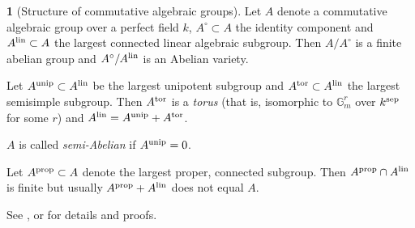 \documentclass{amsart}
\theoremstyle{definition}
\newtheorem{say}[thm]{}
\theoremstyle{remark}
\newcommand{\gm}[0]{{\mathbb G}_m}
\begin{document}
\begin{say}[Structure of commutative algebraic groups]\label{com.al.gr.say}
Let  $A$ denote  a  commutative algebraic group over a perfect field $k$,
  $A^\circ\subset A$ the identity component   and
$A^{\rm lin}\subset A$ the largest connected linear algebraic subgroup. Then 
$A/A^\circ$ is a finite abelian group and  $A^\circ/A^{\rm lin}$ is an Abelian variety.

Let  $A^{\rm unip}\subset A^{\rm lin}$ be the largest unipotent subgroup
 and    $A^{\rm tor}\subset A^{\rm lin}$ the largest semisimple subgroup.
Then 
$A^{\rm tor}$ is a {\it torus} (that is, isomorphic to   $\gm^r$ over $ k^{\rm sep}$ for some $r$)   and
$A^{\rm lin}=A^{\rm unip}+A^{\rm tor}$.

$A$ is called  {\it semi-Abelian} if $A^{\rm unip}=0$.

Let $A^{\rm prop}\subset A$ denote the largest proper, connected subgroup.
Then $A^{\rm prop}\cap A^{\rm lin}$ is finite but usually
$A^{\rm prop}+ A^{\rm lin}$ does not equal $A$. 

See    \cite{borel}, \cite[Chap.8]{MR3729270} or \cite{MR3645068}
for details and proofs.
\end{say}
\end{document}
